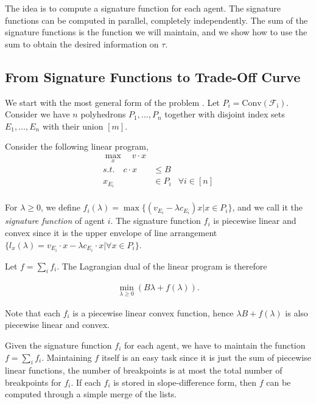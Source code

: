 \documentclass{article}
\newcommand{\lps}{\tau}
\begin{document}
The idea is to compute a signature function for each agent. The signature functions can be computed in parallel, completely independently.
The sum of the signature functions is the function we will maintain, and we show how to use the sum to obtain the desired information on $\lps$.

\subsection{From Signature Functions to Trade-Off Curve}
\label{sec:sigf}

We start with the most general form of the problem . Let $P_i = \operatorname{Conv(\mathcal{F}_i)}$. Consider we have $n$ polyhedrons $P_1,\ldots,P_n$ together with disjoint index sets $E_1,\ldots,E_n$ with their union $[m]$.

Consider the following linear program, 
\[
    \begin{aligned}
    \max_x \quad v \cdot x \\
    s.t.   \quad c \cdot x &\leq B & \\
    x_{E_i} &\in P_i & \forall i\in[n]\\
    \end{aligned}
\]

For $\lambda\geq 0$, we define $f_i(\lambda) = \max\{(v_{E_i}-\lambda c_{E_i}) x | x\in P_i \}$, and we call it the \emph{signature function} of agent $i$. The signature function $f_i$ is piecewise linear and convex since it is the upper envelope of line arrangement $\{l_x(\lambda)=v_{E_i}\cdot x-\lambda c_{E_i}\cdot x | \forall x\in P_i\}$.


Let $f = \sum_{i} f_i$. 
The Lagrangian dual of the linear program is therefore


\begin{equation}
\label{eq:Lagrangiandual}
\begin{aligned}
\min_{\lambda\geq 0} \left( B\lambda+f(\lambda)\right).
\end{aligned}
\end{equation}

Note that each $f_i$ is a piecewise linear convex function, hence $\lambda B + f(\lambda)$ is also piecewise linear and convex.

Given the signature function $f_i$ for each agent, we have to maintain the function $f=\sum_{i} f_i$. Maintaining $f$ itself is an easy task since it is just the sum of piecewise linear functions, the number of breakpoints is at most the total number of breakpoints for $f_i$. If each $f_i$ is stored in slope-difference form, then $f$ can be computed through a simple merge of the lists.
\end{document}
